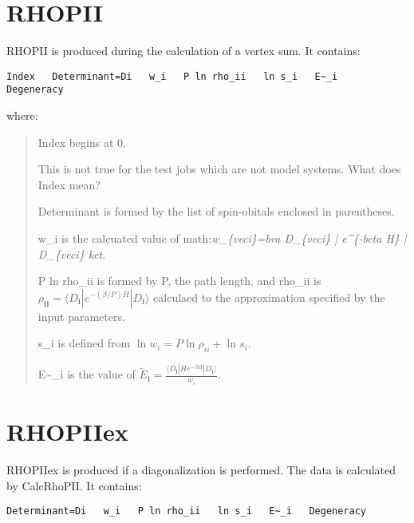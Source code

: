 \documentclass[openany,a4paper,10pt]{manual}
\newcommand{\bra}{\ensuremath{\langle}}
\newcommand{\ket}{\ensuremath{\rangle}}
\newcommand{\veci}{\ensuremath{\mathbf{i}}}
\begin{document}
\resetcurrentobjects


\hypertarget{output-rhopii}{}\section{RHOPII}

RHOPII is produced during the calculation of a vertex sum.  It contains:

\begin{Verbatim}[commandchars=@\[\]]
Index   Determinant=Di   w_i   P ln rho_ii   ln s_i   E~_i   Degeneracy
\end{Verbatim}

where:
\begin{quote}

Index begins at 0.

\begin{notice}[note]
This is not true for the test jobs which are not model systems.  What does Index mean?
\end{notice}

Determinant is formed by the list of spin-obitals enclosed in parentheses.

w\_i is the calcuated value of math:\emph{w\_\{veci\}=bra D\_\{veci\} | e\textasciicircum{}\{-beta H\} | D\_\{veci\} ket}.

P ln rho\_ii is formed by P, the path length, and rho\_ii is
$\rho_{\veci\veci}=\bra D_{\veci} | e^{-(\beta/P) H} | D_{\veci} \ket$
calculaed to the approximation specified by the input parameters.

s\_i is defined from $\operatorname{ln} w_i = P \operatorname{ln} \rho_{ii} + \operatorname{ln} s_i$.

E\textasciitilde{}\_i is the value of $\tilde{E}_{\veci}=\frac{\bra D_{\veci} | H e^{-\beta H} | D_{\veci} \ket}{w_i}$.
\end{quote}

\resetcurrentobjects


\hypertarget{output-rhopiiex}{}\section{RHOPIIex}

RHOPIIex is produced if a diagonalization is performed. The data is calculated
by CalcRhoPII.  It contains:

\begin{Verbatim}[commandchars=@\[\]]
Determinant=Di   w_i   P ln rho_ii   ln s_i   E~_i   Degeneracy
\end{Verbatim}
\end{document}
